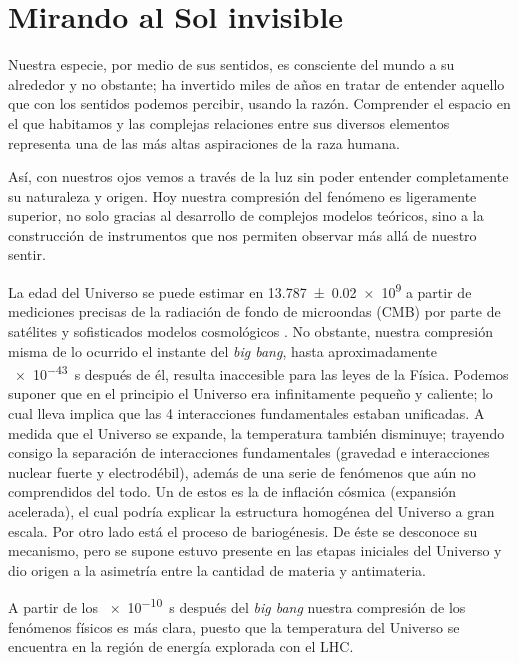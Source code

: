
\chapter{Mirando al Sol invisible}
\label{chap:uno}

Nuestra especie, por medio de sus sentidos, es consciente del mundo a su alrededor y no obstante; ha invertido miles de años en tratar de entender aquello que con los sentidos podemos percibir, usando la razón. Comprender el espacio en el que habitamos y las complejas relaciones entre sus diversos elementos representa una de las más altas aspiraciones de la raza humana.

Así, con nuestros ojos vemos a través de la luz sin poder entender completamente su naturaleza y origen. Hoy nuestra compresión del fenómeno es ligeramente superior, no solo gracias al desarrollo de complejos modelos teóricos, sino a la construcción de instrumentos que nos permiten observar más allá de nuestro sentir.

La edad del Universo se puede estimar en \SI{13.787(20)e9}{\year} a partir de mediciones precisas de la radiación de fondo de microondas (CMB) por parte de satélites y sofisticados modelos cosmológicos \cite{}. No obstante, nuestra compresión misma de lo ocurrido el instante del \emph{big bang}, hasta aproximadamente \SI{e-43}{\second} después de él, resulta inaccesible para las leyes de la Física. Podemos suponer que en el principio el Universo era infinitamente pequeño y caliente; lo cual lleva implica que las \num{4} interacciones fundamentales estaban unificadas. A medida que el Universo se expande, la temperatura también disminuye; trayendo consigo la separación de interacciones fundamentales (gravedad e interacciones nuclear fuerte y electrodébil), además de una serie de fenómenos que aún no comprendidos del todo. Un de estos es la de inflación cósmica (expansión acelerada), el cual podría explicar la estructura homogénea del Universo a gran escala. Por otro lado está el proceso de bariogénesis. De éste se desconoce su mecanismo, pero se supone estuvo presente en las etapas iniciales del Universo y dio origen a la asimetría entre la cantidad de materia y antimateria.

A partir de los \SI{e-10}{\second} después del \emph{big bang} nuestra compresión de los fenómenos físicos es más clara, puesto que la temperatura del Universo se encuentra en la región de energía explorada con el LHC.  

